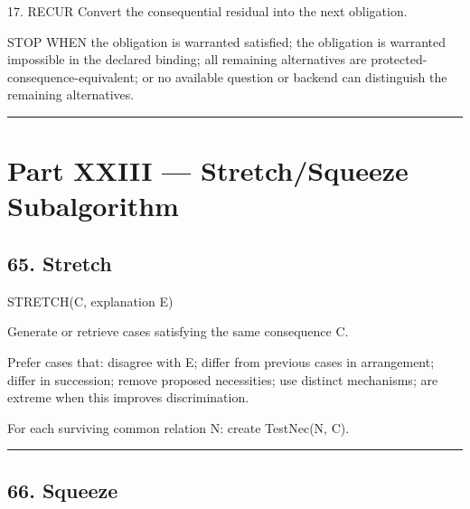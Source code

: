 \documentclass[
]{article}
\newenvironment{Shaded}{}{}
\newcommand{\NormalTok}[1]{#1}
\begin{document}
\begin{Shaded}
\begin{Highlighting}[]
\NormalTok{17. RECUR}
\NormalTok{    Convert the consequential residual into the next obligation.}

\NormalTok{STOP WHEN}
\NormalTok{    the obligation is warranted satisfied;}
\NormalTok{    the obligation is warranted impossible in the declared binding;}
\NormalTok{    all remaining alternatives are protected{-}consequence{-}equivalent;}
\NormalTok{    or no available question or backend can distinguish the remaining alternatives.}
\end{Highlighting}
\end{Shaded}

\begin{center}\rule{0.5\linewidth}{0.5pt}\end{center}

\section{Part XXIII --- Stretch/Squeeze
Subalgorithm}\label{part-xxiii-stretchsqueeze-subalgorithm}

\subsection{65. Stretch}\label{stretch}

\begin{Shaded}
\begin{Highlighting}[]
\NormalTok{STRETCH(C, explanation E)}

\NormalTok{Generate or retrieve cases satisfying the same consequence C.}

\NormalTok{Prefer cases that:}
\NormalTok{    disagree with E;}
\NormalTok{    differ from previous cases in arrangement;}
\NormalTok{    differ in succession;}
\NormalTok{    remove proposed necessities;}
\NormalTok{    use distinct mechanisms;}
\NormalTok{    are extreme when this improves discrimination.}

\NormalTok{For each surviving common relation N:}
\NormalTok{    create TestNec(N, C).}
\end{Highlighting}
\end{Shaded}

\begin{center}\rule{0.5\linewidth}{0.5pt}\end{center}

\subsection{66. Squeeze}\label{squeeze}
\end{document}
